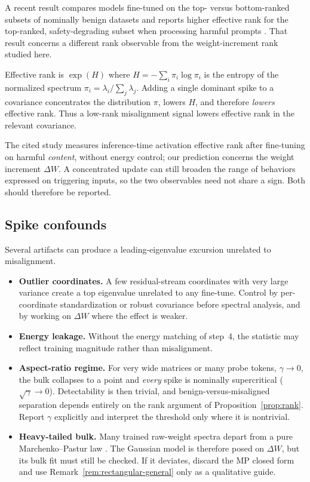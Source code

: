\documentclass[11pt]{article}
\theoremstyle{definition}
\theoremstyle{remark}
\newcommand{\dW}{\Delta W}
\begin{document}
A recent result compares models fine-tuned on the top- versus bottom-ranked subsets
of nominally benign datasets and reports higher effective rank for the top-ranked,
safety-degrading subset when processing harmful prompts \cite{larf2025}. That result concerns
a different rank observable from the weight-increment rank studied here.

Effective rank \cite{roy2007} is $\exp(H)$ where $H = -\sum_i \pi_i \log \pi_i$ is the entropy of the
normalized spectrum $\pi_i = \lambda_i / \sum_j \lambda_j$. Adding a single dominant spike
to a covariance concentrates the distribution $\pi$, lowers $H$, and therefore
\emph{lowers} effective rank. Thus a low-rank misalignment signal lowers effective rank in
the relevant covariance.

The cited study measures inference-time activation effective rank after
fine-tuning on harmful \emph{content}, without energy control; our prediction
concerns the weight increment $\dW$. A concentrated update can still broaden the
range of behaviors expressed on triggering inputs, so the two observables need
not share a sign. Both should therefore be reported.

\subsection{Spike confounds}
\label{sec:confounds}

Several artifacts can produce a leading-eigenvalue excursion unrelated to misalignment.
\begin{itemize}[leftmargin=1.4em,itemsep=2pt]
\item \textbf{Outlier coordinates.} A few residual-stream coordinates with very large
variance \cite{sun2024} create a top eigenvalue unrelated to any fine-tune. Control by
per-coordinate standardization or robust covariance before spectral analysis, and by
working on $\dW$ where the effect is weaker.
\item \textbf{Energy leakage.} Without the energy matching of step~4, the statistic may
reflect training magnitude rather than misalignment.
\item \textbf{Aspect-ratio regime.} For very wide matrices or many probe tokens, $\gamma
\to 0$, the bulk collapses to a point and \emph{every} spike is nominally supercritical
($\sqrt\gamma \to 0$). Detectability is then trivial, and benign-versus-misaligned
separation depends entirely on the rank argument of Proposition~\ref{prop:rank}. Report
$\gamma$ explicitly and interpret the threshold only where it is nontrivial.
\item \textbf{Heavy-tailed bulk.} Many trained raw-weight spectra depart from a
pure Marchenko--Pastur law \cite{martin2021}. The Gaussian model is therefore
posed on $\dW$, but its bulk fit must still be checked. If it deviates, discard
the MP closed form and use Remark~\ref{rem:rectangular-general} only as a
qualitative guide.
\end{itemize}
\end{document}
